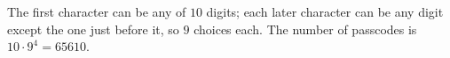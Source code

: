 The first character can be any of $10$ digits; each later character can be any digit except the one just before it, so $9$ choices each. The number of passcodes is $10\cdot9^4=\boxed{65610}$.
